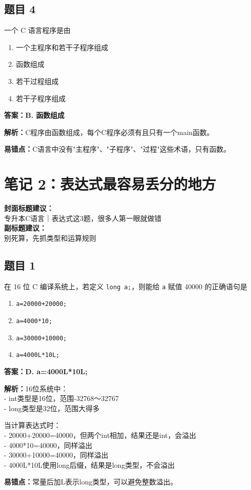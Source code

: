 \documentclass[12pt,a4paper]{ctexart}
\begin{document}
\subsection*{题目 4}
一个 C 语言程序是由
\begin{enumerate}[label=\Alph*.]
	\item 一个主程序和若干子程序组成
	\item 函数组成
	\item 若干过程组成
	\item 若干子程序组成
\end{enumerate}

\begin{answerbox}
	\textbf{答案：B. 函数组成}

	\textbf{解析：}C程序由函数组成，每个C程序必须有且只有一个main函数。

	\textbf{易错点：}C语言中没有"主程序"、"子程序"、"过程"这些术语，只有函数。
\end{answerbox}

\newpage

\section{笔记 2：表达式最容易丢分的地方}
\begin{coverbox}
	\textbf{封面标题建议：}\\
	专升本C语言｜表达式这3题，很多人第一眼就做错\\
	\textbf{副标题建议：}\\
	别死算，先抓类型和运算规则
\end{coverbox}

\subsection*{题目 1}
在 16 位 C 编译系统上，若定义 \texttt{long a;}，则能给 \texttt{a} 赋值 40000 的正确语句是
\begin{enumerate}[label=\Alph*.]
	\item \texttt{a=20000+20000;}
	\item \texttt{a=4000*10;}
	\item \texttt{a=30000+10000;}
	\item \texttt{a=4000L*10L;}
\end{enumerate}

\begin{answerbox}
	\textbf{答案：D. a=4000L*10L;}

	\textbf{解析：}16位系统中：\\
	- int类型是16位，范围-32768～32767\\
	- long类型是32位，范围大得多

	当计算表达式时：\\
	- 20000+20000=40000，但两个int相加，结果还是int，会溢出\\
	- 4000*10=40000，同样溢出\\
	- 30000+10000=40000，同样溢出\\
	- 4000L*10L使用long后缀，结果是long类型，不会溢出

	\textbf{易错点：}常量后加L表示long类型，可以避免整数溢出。
\end{answerbox}
\end{document}
